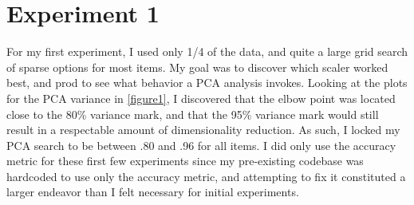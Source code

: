 \documentclass[12pt]{article}
\begin{document}
\section{Experiment 1}
For my first experiment, I used only 1/4 of the data, and quite a large grid search of sparse options for most 
items.  My goal was to discover which scaler worked best, and prod to see what behavior a PCA analysis invokes. 
Looking at the plots for the PCA variance in \ref{figure1}, I discovered that the elbow point was located close 
to the 80\% variance mark, and that the 95\% variance mark would still result in a respectable amount of dimensionality
reduction. As such, I locked my PCA search to be between .80 and .96 for all items. I did only use the accuracy metric 
for these first few experiments since my pre-existing codebase was hardcoded to use only the accuracy metric, and attempting
to fix it constituted a larger endeavor than I felt necessary for initial experiments.
\end{document}
